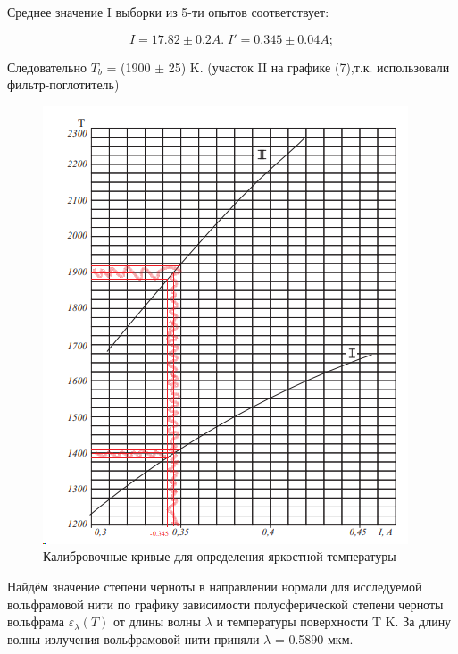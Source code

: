 \documentclass[12pt,a4paper]{article}
\begin{document}
	Среднее значение I выборки из 5-ти опытов соответствует:
	
	\begin{equation}
		I =  17.82 \pm 0.2 A. \; I' = 0.345 \pm 0.04 A;
	\end{equation}

	Следовательно $T_b$ = (1900 $\pm$ 25) K. (участок II на графике (7),т.к. использовали фильтр-поглотитель)

\begin{figure}[H]
	\centering
	\includegraphics[scale=1.2]{7}
	\caption{Калибровочные кривые для определения яркостной температуры}
	\label{fig:7}
\end{figure}
	
	
	Найдём значение степени черноты в направлении нормали для исследуемой вольфрамовой нити по  графику зависимости полусферической степени черноты вольфрама $\varepsilon_{\lambda}(T)$ от длины волны $\lambda$ и температуры поверхности T K. 	За длину волны излучения вольфрамовой нити приняли $\lambda$ = 0.5890 мкм.
	
\end{document}
